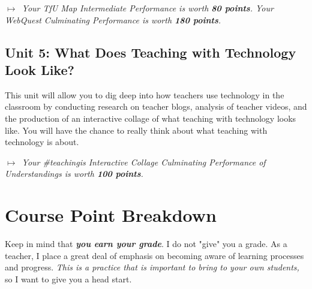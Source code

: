 \documentclass{tufte-handout}
\begin{document}
\medskip\noindent\textit{$\mapsto$~Your TfU Map Intermediate Performance is worth \textbf{80 points}. Your WebQuest Culminating Performance is worth \textbf{180 points}.}

\subsection{Unit 5: What Does Teaching with Technology Look Like?}

This unit will allow you to dig deep into how teachers use technology in the classroom by conducting research on teacher blogs, analysis of teacher videos, and the production of an interactive collage of what teaching with technology looks like. You will have the chance to really think about what teaching with technology is about.

\medskip\noindent\textit{$\mapsto$~Your \#teachingis Interactive Collage Culminating Performance of Understandings is worth \textbf{100 points}.}


\section{Course Point Breakdown}

Keep in mind that \emph{\textbf{you earn your grade}}. I do not "give" you a grade. As a teacher, I place a great deal of emphasis on becoming aware of learning processes and progress. \emph{This is a practice that is important to bring to your own students,} so I want to give you a head start.

\bigskip
\end{document}
